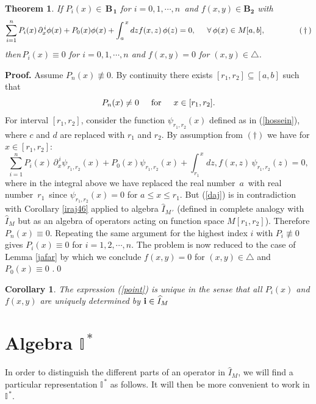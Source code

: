 \documentclass[10pt]{article}
\newcommand{\be}{\begin{equation}}
\newcommand{\ee}{\end{equation}}
\newcommand{\nn}{\nonumber}
\newcommand{\rd}{\partial}
\newcommand{\mIs}{{{\mathbb I}}^{\,*}}
\newcommand{\mIm}{\widehat{I}_{M}}
\newtheorem{thm}{Theorem}
\newtheorem{cor}{Corollary}
\begin{document}
{{\begin{thm}\label{emam}{If $P_{i}(x)\in \,\boldsymbol{B_{\,1}}$ for $i=0,1,\cdots,n$\, and $f(x,y)\in
\boldsymbol{B_2}$ with\, \be\sum^{n}_{i=1} P_{i}(x)
\,\rd_{x}^{\,i}\phi(x)+P_{0}(x)\phi(x)+\int^{\,x}_{a} dz
f(x,z)\,\phi(z)=0,\hspace{0.5cm}\forall\, \phi(x)\in
M[a,b],\label{baghi}\nn\hspace{1.5cm} (\,\dagger\,)\ee
then\,$P_{i}(x)\equiv 0$ for $i=0,1,\cdots,n$ and $f(x,y)=0$ for
$(x,y)\in \triangle$.}
\end{thm}

{\bf Proof.} Assume $P_{n}(x)\not\equiv 0$. By continuity there exists
$[r_1,r_2]\subseteq[a,b]$ such that \be
P_{n}(x)\ne0\hspace{0.5cm} \text{for} \hspace{0.5cm}x\in
[r_1,r_2].\nn\ee
For interval $[r_1,r_2]$, consider the function $\psi_{r_1,r_2}(x)$
defined as in (\ref{hossein}), where $c$ and $d$ are replaced with
$r_1$ and $r_2$. By assumption from $(\dagger)$ we have for
$x\in[r_1,r_2]$: \be\sum^{n}_{i=1} P_{i}(x)
\,\rd_{x}^{\,i}\psi_{r_1,r_2}(x)+P_{0}(x)\psi_{r_1,r_2}(x)+\int^{\,x}_{r_{1}}
dz, f(x,z)\,\psi_{r_1,r_2}(z)=0,\label{daj}\ee where in the integral
above we have replaced the real number\, $a$\, with real number
\,$r_{1}$ \,since $\psi_{r_1,r_2}(x)=0$ for $a\leq x\leq r_{1}$. But
(\ref{daj}) is in contradiction with Corollary \ref{iraj46} applied
to algebra $\widehat{I}_{M{\,'}}$ (defined in complete analogy with
$\mIm$ but as an algebra of operators acting on function space
$M[r_{1}, r_{2}]$). Therefore $P_{n}(x)\equiv0$. Repeating the same argument for the
highest index $i$ with $P_i\not\equiv0$ gives $P_{i}(x)\equiv0$ for
$i=1,2,\cdots,n$. The problem is now reduced to the case of Lemma
\ref{jafar} by which we conclude $f(x,y)= 0$ for $(x,y)\in\triangle$
and $P_{0}(x)\equiv 0$ .\qed\\

\begin{cor}\label{kor}{The expression (\ref{point}) is unique in the sense that all $P_{i}(x)$ and $f(x,y)$
are uniquely determined by ${\bf i}\in \mIm$}
\end{cor}
 \section {Algebra $\mIs$}
 \label{mary}
In order to distinguish the different parts of an operator in
$\mIm$, we will find a particular representation $\mIs$ as follows.
It will then be more convenient to work in $\mIs$.


}}
\end{document}
